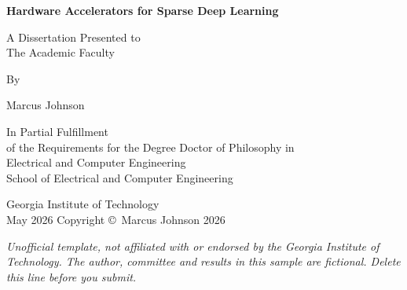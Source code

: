 \begin{titlepage}
\centering
\begin{singlespace}
\vspace*{0.3in}
{\bfseries Hardware Accelerators for Sparse Deep Learning\par}
\vspace{1.6in}
A Dissertation Presented to\\
The Academic Faculty\par
\vspace{0.5in}
By\par
\vspace{0.5in}
Marcus Johnson\par
\vspace{0.6in}
In Partial Fulfillment\\
of the Requirements for the Degree Doctor of Philosophy in\\
Electrical and Computer Engineering\\
School of Electrical and Computer Engineering\par
\vspace{0.9in}
Georgia Institute of Technology\\[\baselineskip]
May 2026
\vfill
Copyright \copyright\ Marcus Johnson 2026\par
\vspace{0.3in}
{\footnotesize\itshape Unofficial template, not affiliated with or endorsed by the Georgia Institute of Technology. The author, committee and results in this sample are fictional. Delete this line before you submit.}
\end{singlespace}
\end{titlepage}
